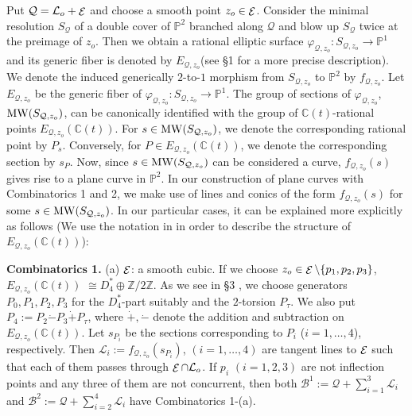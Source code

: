 \documentclass{article}
\newcommand{\ZZ}{\mathbb Z}
\newcommand{\PP}{\mathbb P}
\newcommand{\CC}{\mathbb C}
\newcommand{\mcB}{\mathcal B}
\newcommand{\mcL}{\mathcal L}
\newcommand{\mcQ}{\mathcal Q}
\newcommand{\MW}{\mathop {\rm MW}\nolimits}
\newcommand{\mcE}{\mathop {\cal E}\nolimits}
\begin{document}
Put $\mcQ = \mcL_o + \mcE$ and choose a smooth point $z_o \in \mcE$. 
Consider the minimal resolution $S_{\mcQ}$ of a double cover of $\PP^2$ branched along $\mcQ$ and blow up $S_{\mcQ}$  twice at the 
preimage of $z_o$. Then we obtain a rational elliptic surface 
$\varphi_{\mcQ, z_o} : S_{\mcQ, z_o} \to \PP^1$ and its generic fiber is denoted by $E_{\mcQ, z_o}$(see \S 1 for a more precise description). 
 We denote the induced generically $2$-to-$1$ morphism from $S_{\mcQ, z_o}$ to $\PP^2$ by $f_{\mcQ, z_o}$. Let  $E_{\mcQ,z_o}$ be
 the generic fiber of $\varphi_{\mcQ, z_o} : S_{\mcQ, z_o} \to \PP^1$.  The group of sections of $\varphi_{\mcQ, z_o}$, 
 $\MW(S_{\mcQ, z_o})$,  can be canonically  identified with the group of $\CC(t)$-rational points $E_{\mcQ, z_o}(\CC(t))$.
  For $s \in \MW(S_{\mcQ, z_o})$, we denote the corresponding rational  point by $P_s$. Conversely, for $P \in E_{\mcQ, z_o}(\CC(t))$,
 we denote the corresponding section by $s_P$. Now, since $s \in \MW(S_{\mcQ, z_o})$ can be considered a curve,
$f_{\mcQ, z_o}(s)$ gives rise to a plane curve in $\PP^2$. In our construction of plane curves with Combinatorics 1 and 2,
we make use of lines and conics of the form $f_{\mcQ, z_o}(s)$ for some $s \in \MW(S_{\mcQ, z_o})$. In our particular cases,  it can be
explained more explicitly as follows (We use the notation in 
\cite{oguiso-shioda} in order to describe the structure of $E_{\mcQ, z_o}(\CC(t))$):
%
% 
% 
\medskip

{\bf Combinatorics 1.}
(a) $\mcE$: a smooth cubic.  If we choose $z_o \in \mcE \setminus \{p_1, p_2, p_3\}$, 
$E_{\mcQ, z_o}(\CC(t))$ $ \cong D_4^* \oplus \ZZ/2\ZZ$.  As we see in \S 3 , 
we choose generators  $P_0, P_1, P_2, P_3$ for the $D_4^*$-part suitably and the $2$-torsion $P_{\tau}$.    We also 
put $P_4 := P_2 \dot{-}P_3 \dot{+}P_{\tau}$, where $\dot{+}, \dot{-}$ denote the addition and subtraction on $E_{\mcQ, z_o}(\CC(t))$.
 Let $s_{P_i}$ be the sections corresponding to $P_i$ ($i = 1, \ldots, 4$),
respectively.
Then $\mcL_i := f_{\mcQ, z_o}(s_{P_i})$, $(i = 1, \ldots, 4)$ are
tangent lines to $\mcE$ such that each of them passes through $\mcE \cap \mcL_o$.  If $p_i$  $(i = 1, 2, 3)$ are not 
inflection points and any three of them are not concurrent, then
both $\mcB^1:= \mcQ + \sum_{i=1}^3 \mcL_i$ and 
$\mcB^2:= \mcQ + \sum_{i=2}^4 \mcL_i$ have Combinatorics 1-(a).
\end{document}
